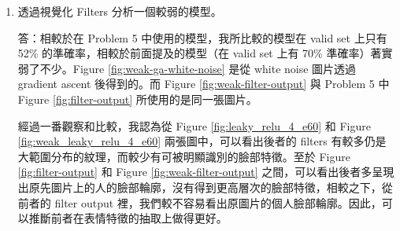 \documentclass[12pt,a4paper]{extarticle}
\begin{document}
\begin{enumerate}
  \begin{enumerate}
    \item 透過視覺化 Filters 分析一個較弱的模型。
    \par 答：相較於在 Problem 5 中使用的模型，我所比較的模型在 valid set 上只有 52\% 的準確率，相較於前面提及的模型（在 valid set 上有 70\% 準確率）著實弱了不少。Figure \ref{fig:weak-ga-white-noise} 是從 white noise 圖片透過 gradient ascent 後得到的。而 Figure \ref{fig:weak-filter-output} 與 Problem 5 中 Figure \ref{fig:filter-output} 所使用的是同一張圖片。
    \par 經過一番觀察和比較，我認為從 Figure \ref{fig:leaky_relu_4_e60} 和 Figure \ref{fig:weak_leaky_relu_4_e60} 兩張圖中，可以看出後者的 filters 有較多仍是大範圍分布的紋理，而較少有可被明顯識別的臉部特徵。至於 Figure \ref{fig:filter-output} 和 Figure \ref{fig:weak-filter-output} 之間，可以看出後者多呈現出原先圖片上的人的臉部輪廓，沒有得到更高層次的臉部特徵，相較之下，從前者的 filter output 裡，我們較不容易看出原圖片的個人臉部輪廓。因此，可以推斷前者在表情特徵的抽取上做得更好。


\end{enumerate}
\end{enumerate}
\end{document}
